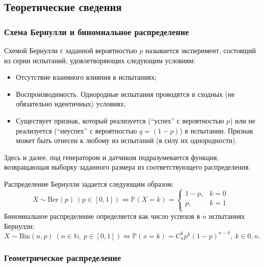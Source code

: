 \documentclass{article}
\theoremstyle{definition}
\begin{document}
\subsection{Теоретические сведения}

\subsubsection{Схема Бернулли и биномиальное распределение}

Схемой Бернулли с заданной вероятностью \(p\) называется эксперимент,
состоящий из серии испытаний, удовлетворяющих следующим условиям:
\begin{itemize}
    \item Отсутствие взаимного влияния в испытаниях;
    \item Воспроизводимость. Однородные испытания проводятся в сходных (не обязательно идентичных) условиях;
    \item Существует признак, который реализуется (“успех” с вероятностью \(p\)) или не реализуется (“неуспех” с вероятностью \(q = (1 - p)\)) в испытании. Признак может
быть отнесен к любому из испытаний (в силу их однородности).
\end{itemize}
Здесь и далее, под генератором и датчиком подразумевается функция, возвращающая выборку заданного размера из соответствующего распределения.

Распределение Бернулли задается следующим образом:
\[X \sim \text{Ber}(p)\ (p \in [0, 1]) \Leftrightarrow \mathbb{P}(X = k) = \begin{cases}
      1-p,&k = 0\\
      p,&k = 1\\
  \end{cases}\]
Биномиальное распределение определяется как число успехов в \(n\) испытаниях Бернулли:
\[X \sim \text{Bin}(n, p)\ (n \in \mathbb{N},\ p \in [0, 1]) \Leftrightarrow \mathbb{P}(x = k) = C_n^k p^k (1 - p)^{n - k},\ k \in \overline{0, n}.\]

\subsubsection{Геометрическое распределение}
\end{document}
